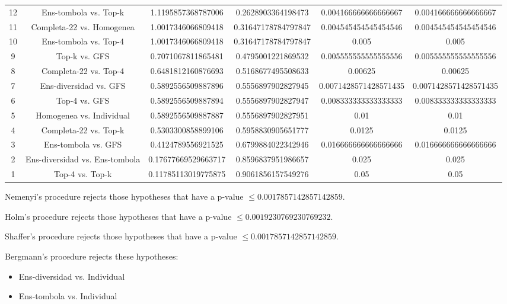 \documentclass[a4paper,10pt]{article}
\begin{document}
\begin{landscape}
\begin{table}[!htp]
\begin{tabular}{cccccc}
12&Ens-tombola vs. Top-k&1.1195857368787006&0.2628903364198473&0.004166666666666667&0.004166666666666667\\
11&Completa-22 vs. Homogenea&1.0017346066809418&0.31647178784797847&0.004545454545454546&0.004545454545454546\\
10&Ens-tombola vs. Top-4&1.0017346066809418&0.31647178784797847&0.005&0.005\\
9&Top-k vs. GFS&0.7071067811865481&0.4795001221869532&0.005555555555555556&0.005555555555555556\\
8&Completa-22 vs. Top-4&0.6481812160876693&0.5168677495508633&0.00625&0.00625\\
7&Ens-diversidad vs. GFS&0.5892556509887896&0.5556897902827945&0.0071428571428571435&0.0071428571428571435\\
6&Top-4 vs. GFS&0.5892556509887894&0.5556897902827947&0.008333333333333333&0.008333333333333333\\
5&Homogenea vs. Individual&0.5892556509887887&0.5556897902827951&0.01&0.01\\
4&Completa-22 vs. Top-k&0.5303300858899106&0.5958830905651777&0.0125&0.0125\\
3&Ens-tombola vs. GFS&0.4124789556921525&0.6799884022342946&0.016666666666666666&0.016666666666666666\\
2&Ens-diversidad vs. Ens-tombola&0.17677669529663717&0.8596837951986657&0.025&0.025\\
1&Top-4 vs. Top-k&0.11785113019775875&0.9061856157549276&0.05&0.05\\
\hline
\end{tabular}
\end{table}
Nemenyi's procedure rejects those hypotheses that have a p-value $\le0.0017857142857142859$.


Holm's procedure rejects those hypotheses that have a p-value $\le0.0019230769230769232$.


Shaffer's procedure rejects those hypotheses that have a p-value $\le0.0017857142857142859$.


Bergmann's procedure rejects these hypotheses:


\begin{itemize}


\item Ens-diversidad vs. Individual
\item Ens-tombola vs. Individual
\end{itemize}



\end{landscape}
\end{document}
